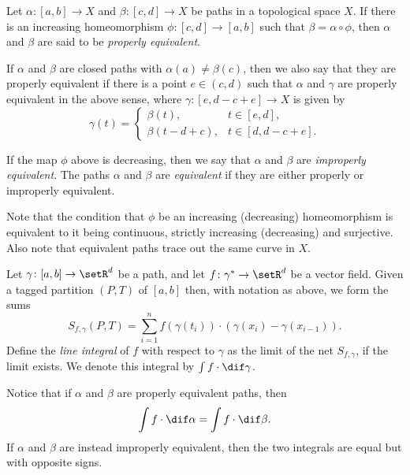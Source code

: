 \documentclass[article, a4paper, 11pt, oneside]{memoir}
\numberwithin{equation}{chapter}
\begin{document}
\begin{definition}
	Let $\alpha \colon [a,b] \to X$ and $\beta \colon [c,d] \to X$ be paths in a topological space $X$. If there is an increasing homeomorphism $\phi \colon [c,d] \to [a,b]$ such that $\beta = \alpha \circ \phi$, then $\alpha$ and $\beta$ are said to be \emph{properly equivalent}.

	If $\alpha$ and $\beta$ are closed paths with $\alpha(a) \neq \beta(c)$, then we also say that they are properly equivalent if there is a point $e \in (c,d)$ such that $\alpha$ and $\gamma$ are properly equivalent in the above sense, where $\gamma \colon [e, d-c+e] \to X$ is given by
	\begin{equation*}
		\gamma(t) =
		\begin{cases}
			\beta(t), & t \in [e,d], \\
			\beta(t-d+c), & t \in [d,d-c+e].
		\end{cases}
	\end{equation*}
	
	If the map $\phi$ above is decreasing, then we say that $\alpha$ and $\beta$ are \emph{improperly equivalent}. The paths $\alpha$ and $\beta$ are \emph{equivalent} if they are either properly or improperly equivalent.
\end{definition}
%
Note that the condition that $\phi$ be an increasing (decreasing) homeomorphism is equivalent to it being continuous, strictly increasing (decreasing) and surjective. Also note that equivalent paths trace out the same curve in $X$.

\begin{definition} %
	Let $\gamma \colon [a,b] \to \setR^d$ be a path, and let $f \colon \gamma^* \to \setR^d$ be a vector field. Given a tagged partition $(P,T)$ of $[a,b]$ then, with notation as above, we form the sums
    \begin{equation*}
        S_{f,\gamma}(P,T)
            = \sum_{i=1}^n f(\gamma(t_i)) \cdot (\gamma(x_i) - \gamma(x_{i-1})).
    \end{equation*}
    Define the \emph{line integral} of $f$ with respect to $\gamma$ as the limit of the net $S_{f,\gamma}$, if the limit exists. We denote this integral by $\int f \cdot \dif\gamma$.
\end{definition}
%
Notice that if $\alpha$ and $\beta$ are properly equivalent paths, then
%
\begin{equation*}
	\int f \cdot \dif\alpha = \int f \cdot \dif\beta.
\end{equation*}
%
If $\alpha$ and $\beta$ are instead improperly equivalent, then the two integrals are equal but with opposite signs.
\end{document}
